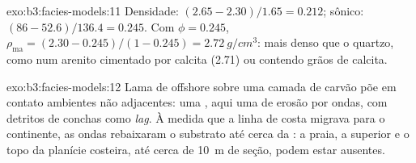 \begin{solution}{exo:b3:facies-models:11}
Densidade: $(2.65 - 2.30)/1.65 = 0.212$; sônico: $(86 - 52.6)/136.4 = 0.245$.
Com $\phi = 0.245$, $\rho_{\mathrm{ma}} = (2.30 - 0.245)/(1 - 0.245) =
\qty{2.72}{g/cm^3}$: mais denso que o quartzo, como num arenito cimentado por
calcita (2.71) ou contendo grãos de calcita.
\end{solution}

\begin{solution}{exo:b3:facies-models:12}
Lama de offshore sobre uma camada de carvão põe em contato ambientes não adjacentes: uma
, aqui uma  de erosão por ondas, com
detritos de conchas como \textit{lag}. À medida que a linha de costa migrava para o continente, as ondas rebaixaram o
substrato até cerca da : a praia, a  superior e o
topo da planície costeira, até cerca de \qty{10}{m} de seção, podem estar
ausentes.
\end{solution}

